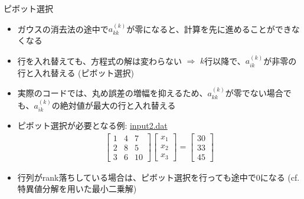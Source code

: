 \begin{frame}[t,fragile]{ピボット選択}
  \begin{itemize}
  \item ガウスの消去法の途中で$a_{kk}^{(k)}$が零になると、計算を先に進めることができなくなる
  \item 行を入れ替えても、方程式の解は変わらない $\Rightarrow$ $k$行以降で、$a_{ik}^{(k)}$が非零の行と入れ替える (ピボット選択)
  \item 実際のコードでは、丸め誤差の増幅を抑えるため、$a_{kk}^{(k)}$が零でない場合でも、$a_{ik}^{(k)}$の絶対値が最大の行と入れ替える
  \item ピボット選択が必要となる例: \href{https://github.com/todo-group/computer-experiments/blob/master/exercise/linear_system/input2.dat}{input2.dat}
    \begin{align*}
      \begin{bmatrix} 1 & 4 & 7 \\ 2 & 8 & 5 \\ 3 & 6 & 10 \end{bmatrix} \begin{bmatrix} x_1 \\ x_2 \\ x_3 \end{bmatrix} = \begin{bmatrix} 30 \\ 33 \\ 45 \end{bmatrix}
    \end{align*}
    \item 行列がrank落ちしている場合は、ピボット選択を行っても途中で0になる (cf. 特異値分解を用いた最小二乗解)
  \end{itemize}
\end{frame}
